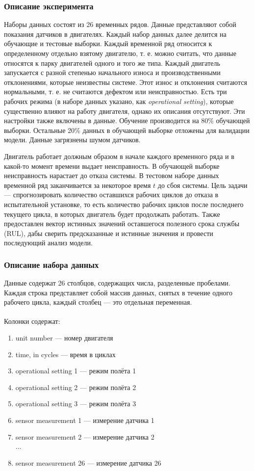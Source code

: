 \documentclass[14pt]{extarticle}
\begin{document}
\subsubsection{Описание эксперимента}

Наборы данных состоят из 26 временных рядов. Данные представляют собой показания датчиков в двигателях. Каждый набор данных далее делится на обучающие и тестовые выборки. Каждый временной ряд относится к определенному отдельно взятому двигателю, т. е. можно считать, что данные относятся к парку двигателей одного и того же типа. Каждый двигатель запускается с разной степенью начального износа и производственными отклонениями, которые неизвестны системе. Этот износ и отклонения считаются нормальными, т. е. не считаются дефектом или неисправностью. Есть три рабочих режима (в наборе данных указано, как {\it operational setting}), которые существенно влияют на работу двигателя, однако их описания отсутствуют.  Эти настройки также включены в данные. Обучение производится на 80\% обучающей выборки. Остальные 20\% данных в обучающей выборке отложены для валидации модели. Данные загрязнены шумом датчиков.

Двигатель работает должным образом в начале каждого временного ряда и в какой-то момент времени выдает неисправность. В обучающей выборке неисправность нарастает до отказа системы. В тестовом наборе данных временной ряд заканчивается за некоторое время $t$ до сбоя системы. Цель задачи --- спрогнозировать количество оставшихся рабочих циклов до отказа в испытательной установке, то есть количество рабочих циклов после последнего текущего цикла, в которых двигатель будет продолжать работать. Также предоставлен вектор истинных значений оставшегося полезного срока службы (RUL), дабы сверить предсказанные и истинные значения и провести последующий анализ модели. 

\subsubsection{Описание набора данных}

Данные содержат 26 столбцов, содержащих числа, разделенные пробелами. Каждая строка представляет собой массив данных, снятых в течение одного рабочего цикла, каждый столбец --- это отдельная переменная.
\\
\\
Колонки содержат:
\begin{enumerate} 
	\item unit number --- номер двигателя
	\item time, in cycles --- время в циклах
	\item operational setting 1 --- режим полёта 1
	\item operational setting 2 --- режим полёта 2
	\item operational setting 3 --- режим полёта 3
	\item sensor measurement 1 --- измерение датчика 1	
	\item sensor measurement 2 --- измерение датчика 2
	\\
	...
	\setcounter{enumi}{25}
	\item sensor measurement 26 --- измерение датчика 26
\end{enumerate}
\end{document}
